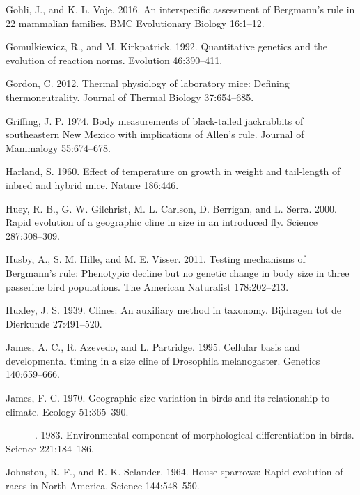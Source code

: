 \documentclass[]{article}
\begin{document}
\leavevmode\hypertarget{ref-Gohli2016}{}%
Gohli, J., and K. L. Voje. 2016. An interspecific assessment of
Bergmann's rule in 22 mammalian families. BMC Evolutionary Biology
16:1--12.

\leavevmode\hypertarget{ref-Gomulkiewicz1992}{}%
Gomulkiewicz, R., and M. Kirkpatrick. 1992. Quantitative genetics and
the evolution of reaction norms. Evolution 46:390--411.

\leavevmode\hypertarget{ref-Gordon2012}{}%
Gordon, C. 2012. Thermal physiology of laboratory mice: Defining
thermoneutrality. Journal of Thermal Biology 37:654--685.

\leavevmode\hypertarget{ref-Griffing1974}{}%
Griffing, J. P. 1974. Body measurements of black-tailed jackrabbits of
southeastern New Mexico with implications of Allen's rule. Journal of
Mammalogy 55:674--678.

\leavevmode\hypertarget{ref-Harland1960}{}%
Harland, S. 1960. Effect of temperature on growth in weight and
tail-length of inbred and hybrid mice. Nature 186:446.

\leavevmode\hypertarget{ref-Huey2000}{}%
Huey, R. B., G. W. Gilchrist, M. L. Carlson, D. Berrigan, and L. Serra.
2000. Rapid evolution of a geographic cline in size in an introduced
fly. Science 287:308--309.

\leavevmode\hypertarget{ref-Husby2011}{}%
Husby, A., S. M. Hille, and M. E. Visser. 2011. Testing mechanisms of
Bergmann's rule: Phenotypic decline but no genetic change in body size
in three passerine bird populations. The American Naturalist
178:202--213.

\leavevmode\hypertarget{ref-Huxley1939}{}%
Huxley, J. S. 1939. Clines: An auxiliary method in taxonomy. Bijdragen
tot de Dierkunde 27:491--520.

\leavevmode\hypertarget{ref-James1995}{}%
James, A. C., R. Azevedo, and L. Partridge. 1995. Cellular basis and
developmental timing in a size cline of Drosophila melanogaster.
Genetics 140:659--666.

\leavevmode\hypertarget{ref-James1970}{}%
James, F. C. 1970. Geographic size variation in birds and its
relationship to climate. Ecology 51:365--390.

\leavevmode\hypertarget{ref-James1983}{}%
---------. 1983. Environmental component of morphological
differentiation in birds. Science 221:184--186.

\leavevmode\hypertarget{ref-Johnston1964}{}%
Johnston, R. F., and R. K. Selander. 1964. House sparrows: Rapid
evolution of races in North America. Science 144:548--550.
\end{document}
